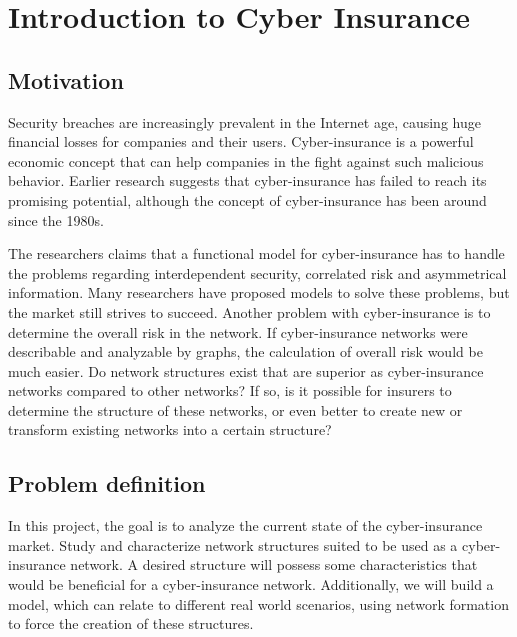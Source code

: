 \chapter{Introduction to Cyber Insurance}
\label{chp:introductionToCyberInsurance} 

\section{Motivation}
Security breaches are increasingly prevalent in the Internet age, causing huge financial losses for companies and their users. Cyber-insurance is a powerful economic concept that can help companies in the fight against such malicious behavior. Earlier research suggests that cyber-insurance has failed to reach its promising potential, although the concept of cyber-insurance has been around since the 1980s. 

The researchers claims that a functional model for cyber-insurance has to handle the problems regarding interdependent security, correlated risk and asymmetrical information. Many researchers have proposed models to solve these problems, but the market still strives to succeed. Another problem with cyber-insurance is to determine the overall risk in the network. If cyber-insurance networks were describable and analyzable by graphs, the calculation of overall risk would be much easier. Do network structures exist that are superior as cyber-insurance networks compared to other networks? If so, is it possible for insurers to determine the structure of these networks, or even better to create new or transform existing networks into a certain structure?

\section{Problem definition}
In this project, the goal is to analyze the current state of the cyber-insurance market. Study and characterize network structures suited to be used as a cyber-insurance network. A desired structure will possess some characteristics that would be beneficial for a cyber-insurance network. Additionally, we will build a model, which can relate to different real world scenarios, using network formation to force the creation of these structures. 


